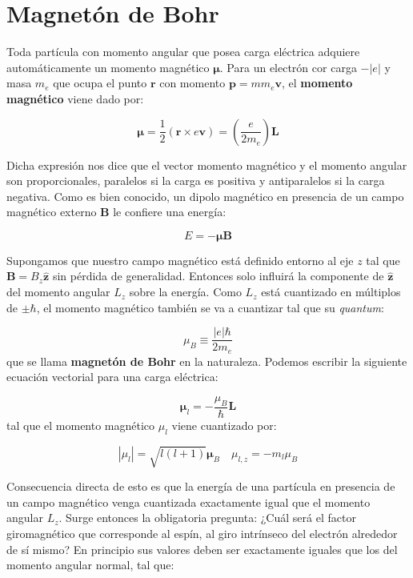 \documentclass[12pt,a4paper]{article}
\numberwithin{equation}{section}
\numberwithin{figure}{section}
\newcommand{\parentesis}[1]{\left( #1  \right)}
\newcommand{\rn}{\mathbf{r}}
\newcommand{\pn}{\mathbf{p}}
\newcommand{\vn}{\mathbf{v}}
\newcommand{\Ln}{\mathbf{L}}
\newcommand{\zn}{\mathbf{\hat{z}}}
\newcommand{\nmu}{\boldsymbol{\mu}}
\newcommand{\Bn}{\mathbf{B}}
\begin{document}
\newpage

\section{Magnetón de Bohr}

Toda partícula con momento angular que posea carga eléctrica adquiere automáticamente un momento magnético $\nmu$. Para un electrón cor carga $-|e|$ y masa $m_e$ que ocupa el punto $\rn$ con momento $\pn = mm_e \vn$, el \textbf{momento magnético} viene dado por:

\begin{equation}
\nmu = \dfrac{1}{2} (\rn \times e \vn) = \parentesis{\dfrac{e}{2 m_e}} \Ln
\end{equation}

Dicha expresión nos dice que el vector momento magnético y el momento angular son proporcionales, paralelos si la carga es positiva y antiparalelos si la carga negativa. Como es bien conocido, un dipolo magnético en presencia de un campo magnético externo $\Bn$ le confiere una energía:

\begin{equation}
E = - \nmu \Bn
\end{equation} 

Supongamos que nuestro campo magnético está definido entorno al eje $z$ tal que $\Bn = B_z \zn$ sin pérdida de generalidad. Entonces solo influirá la componente de $\zn$ del momento angular $L_z$ sobre la energía. Como $L_z$ está cuantizado en múltiplos de $\pm \hbar$, el momento magnético también se va a cuantizar tal que su \textit{quantum}:

\begin{equation}
\mu_B \equiv \dfrac{|e| \hbar}{2 m_e}
\end{equation}
que se llama \textbf{magnetón de Bohr} en la naturaleza. Podemos escribir la siguiente ecuación vectorial para una carga eléctrica:

\begin{equation}
\nmu_l = - \dfrac{\mu_B}{\hbar} \Ln
\end{equation}
tal que el momento magnético $\mu_l$ viene cuantizado por:

\begin{equation}
| \mu_l | = \sqrt{l (l+1)} \nmu_B \quad \mu_{l,z} = - m_l \mu_B
\end{equation}

Consecuencia directa de esto es que la energía de una partícula en presencia de un campo magnético venga cuantizada exactamente igual que el momento angular $L_z$. Surge entonces la obligatoria pregunta: ¿Cuál será el factor giromagnético que corresponde al espín, al giro intrínseco del electrón alrededor de sí mismo? En principio sus valores deben ser exactamente iguales que los del momento angular normal, tal que:
\end{document}
